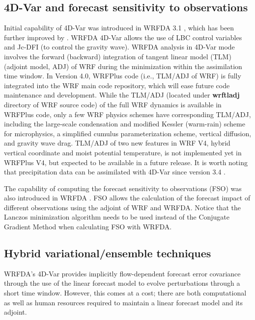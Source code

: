 \subsection{4D-Var and forecast sensitivity to observations}

Initial capability of 4D-Var was introduced in WRFDA 3.1 \citep{huang09}, which has been further
improved by \citet{zhang13, zhang14a}. WRFDA 4D-Var allows the use of LBC control variables and Jc-DFI 
(to control the gravity wave). WRFDA analysis in 4D-Var mode involves the forward (backward) integration of 
tangent linear model (TLM) (adjoint model, ADJ) of WRF during the minimization within the assimilation time window. 
In Version 4.0, WRFPlus code (i.e., TLM/ADJ of WRF) is fully integrated into the WRF main code repository, 
which will ease future code maintenance
and development. While the TLM/ADJ (located under {\bf wrftladj} directory of WRF source code) of the full 
WRF dynamics is available in WRFPlus code, only a few WRF physics schemes have corresponding TLM/ADJ, including
the large-scale condensation and modified Kessler (warm-rain) \citep{wang13b} scheme for microphysics, a simplified
cumulus parameterization scheme, vertical diffusion, and gravity wave drag. TLM/ADJ of two new features in WRF V4, 
hybrid vertical coordinate and moist potential temperature, is not implemented yet in WRFPlus V4, but expected to
be available in a future release.
It is worth noting that precipitation data can be assimilated with 4D-Var since version 3.4 \citep{ban17}.

The capability of computing the forecast sensitivity to observations (FSO) was also introduced in WRFDA \citep{zhang15}. 
FSO allows the calculation of the forecast impact of different observations using the adjoint of WRF and WRFDA. 
Notice that the Lanczos minimization algorithm needs to be used instead of the Conjugate Gradient Method when calculating FSO
with WRFDA.

\subsection{Hybrid variational/ensemble techniques}

WRFDA's 4D-Var provides implicitly flow-dependent forecast error covariance
through the use of the linear forecast model to evolve perturbations through a short time window. 
However, this comes at a cost; there are both computational as well as human resources
required to maintain a linear forecast model and its adjoint. 

